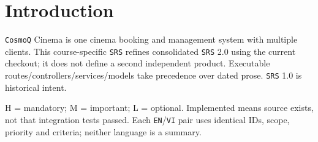 \clearpage
\section{Introduction}\label{sec:srs-1}
\texttt{Cosmo\allowbreak{}Q} Cinema is one cinema booking and management system with multiple clients. This course-specific \texttt{SRS} refines consolidated \texttt{SRS} 2.0 using the current checkout; it does not define a second independent product. Executable routes/\allowbreak{}controllers/\allowbreak{}services/\allowbreak{}models take precedence over dated prose. \texttt{SRS} 1.0 is historical intent.

H = mandatory; M = important; L = optional. Implemented means source exists, not that integration tests passed. Each \texttt{EN}/\allowbreak{}\texttt{VI} pair uses identical IDs, scope, priority and criteria; neither language is a summary.
